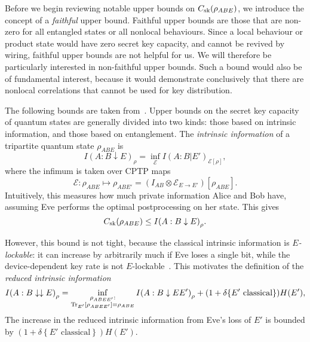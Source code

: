 \documentclass[10pt, a4paper]{article}
\numberwithin{equation}{section} %
\theoremstyle{definition}
\theoremstyle{plain}
\newcommand{\?}{\mathrel{?}} %
\newcommand{\indic}[1]{\delta{\left\{#1\right\}}} %
\newcommand{\Tr}[2][]{\mathop{\mathrm{Tr}#1}\left[ #2 \right]} %
\newcommand{\cE}{\mathcal{E}}
\newcommand{\sk}{\rm sk}
\begin{document}
    Before we begin reviewing notable upper bounds on \(C_{\sk}(\rho_{A B E})\), we introduce the concept of a \emph{faithful} upper bound. Faithful upper bounds are those that are non-zero for all entangled states or all nonlocal behaviours. Since a local behaviour or product state would have zero secret key capacity, and cannot be revived by wiring, faithful upper bounds are not helpful for us. We will therefore be particularly interested in non-faithful upper bounds. Such a bound would also be of fundamental interest, because it would demonstrate conclusively that there are nonlocal correlations that cannot be used for key distribution.

    The following bounds are taken from~\cite{CQKeyDistill}. Upper bounds on the secret key capacity of quantum states are generally divided into two kinds: those based on intrinsic information, and those based on entanglement. The \emph{intrinsic information} of a tripartite quantum state \(\rho_{A B E}\) is
    \begin{equation}
      I{(A : B \downarrow E)}_{\rho} = \inf_{\cE} I{(A : B|E')}_{\cE[\rho]},
    \end{equation}
    where the infimum is taken over CPTP maps 
    \[\cE : \rho_{A B E} \mapsto \rho_{A B E'} = \left(I_{A B} \otimes \cE_{E \to E'}\right)\left[\rho_{A B E}\right]. \] Intuitively, this measures how much private information Alice and Bob have, assuming Eve performs the optimal postprocessing on her state. This gives
    \begin{equation}
      C_{\sk}(\rho_{A B E}) \leq I{(A : B \downarrow E)}_{\rho}.
    \end{equation}

    However, this bound is not tight, because the classical intrinsic information is \emph{\(E\)-lockable}: it can increase by arbitrarily much if Eve loses a single bit, while the device-dependent key rate is not \(E\)-lockable~\cite[Thm 5.1]{CQKeyDistill}. This motivates the definition of the \emph{reduced intrinsic information}
    \begin{equation}\label{eqn:red_intr_info}
      I{(A : B \downarrow\downarrow E)}_{\rho} = \inf_{%
        \substack{\rho_{A B EE'} : \\ 
      \Tr[_{E'}]{\rho_{A B EE'}} = \rho_{A B E}}}
      I{(A : B \downarrow EE')}_{\rho} + (1+\indic{E' \text{ classical}})H(E'),
    \end{equation}
    The increase in the reduced intrinsic information from Eve's loss of \(E'\) is bounded by \((1+\indic{E' \text{ classical}})H(E')\).
\end{document}
